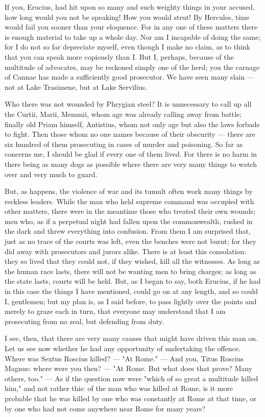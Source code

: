  If you, Erucius, had hit upon so many and such weighty things in your accused, how long would you not be speaking! How you would strut! By Hercules, time would fail you sooner than your eloquence. For in any one of these matters there is enough material to take up a whole day. Nor am I incapable of doing the same; for I do not so far depreciate myself, even though I make no claim, as to think that you can speak more copiously than I. But I, perhaps, because of the multitude of advocates, may be reckoned simply one of the herd; you the carnage of Cannae has made a sufficiently good prosecutor. We have seen many slain --- not at Lake Trasimene, but at Lake Servilius.

 Who there was not wounded by Phrygian steel? It is unnecessary to call up all the Curtii, Marii, Memmii, whom age was already calling away from battle; finally old Priam himself, Antistius, whom not only age but also the laws forbade to fight. Then those whom no one names because of their obscurity --- there are six hundred of them prosecuting in cases of murder and poisoning. So far as concerns me, I should be glad if every one of them lived. For there is no harm in there being as many dogs as possible where there are very many things to watch over and very much to guard.

 But, as happens, the violence of war and its tumult often work many things by reckless leaders. While the man who held supreme command was occupied with other matters, there were in the meantime those who treated their own wounds; men who, as if a perpetual night had fallen upon the commonwealth, rushed in the dark and threw everything into confusion. From them I am surprised that, just as no trace of the courts was left, even the benches were not burnt; for they did away with prosecutors and jurors alike. There is at least this consolation: they so lived that they could not, if they wished, kill all the witnesses. As long as the human race lasts, there will not be wanting men to bring charges; as long as the state lasts, courts will be held. But, as I began to say, both Erucius, if he had in this case the things I have mentioned, could go on at any length, and so could I, gentlemen; but my plan is, as I said before, to pass lightly over the points and merely to graze each in turn, that everyone may understand that I am prosecuting from no zeal, but defending from duty.

 I see, then, that there are very many causes that might have driven this man on. Let us see now whether he had any opportunity of undertaking the offence. Where was Sextus Roscius killed? --- "At Rome." --- And you, Titus Roscius Magnus: where were you then? --- "At Rome. But what does that prove? Many others, too." --- As if the question now were "which of so great a multitude killed him," and not rather this: of the man who was killed at Rome, is it more probable that he was killed by one who was constantly at Rome at that time, or by one who had not come anywhere near Rome for many years?


